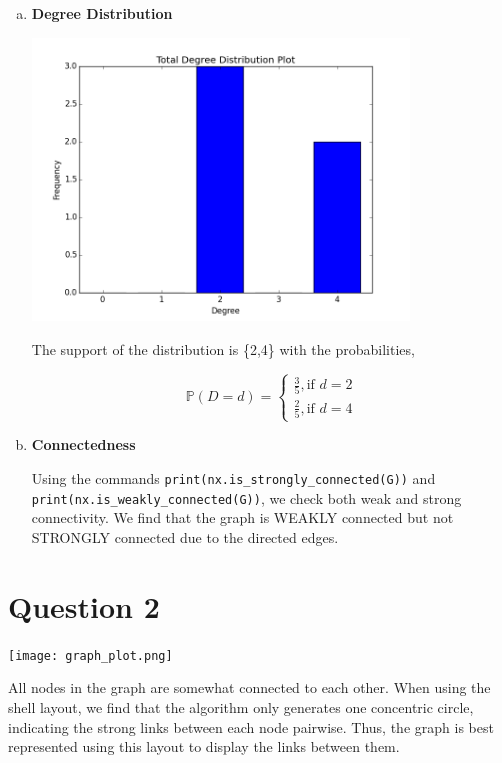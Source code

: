 \documentclass[a4paper]{article}
\begin{document}
\begin{enumerate}[(a)]
\item \textbf{Degree Distribution}

\begin{center}
\includegraphics[width=100mm]{degree_histogram.png}
\end{center}

The support of the distribution is \{2,4\} with the probabilities,

$$\mathbb{P}(D=d)=
\begin{cases}
\frac{3}{5}, \text{if }d=2\\
\frac{2}{5}, \text{if }d=4
\end{cases}
$$

\item \textbf{Connectedness}

Using the commands \texttt{print(nx.is\_strongly\_connected(G))} and \texttt{print(nx.is\_weakly\_connected(G))}, we check both weak and strong connectivity. We find that the graph is WEAKLY connected but not STRONGLY connected due to the directed edges.

\end{enumerate}

\section*{Question 2}

\begin{center}
\texttt{[image: graph\_plot.png]}
\end{center}

All nodes in the graph are somewhat connected to each other. When using the shell layout, we find that the algorithm only generates one concentric circle, indicating the strong links between each node pairwise. Thus, the graph is best represented using this layout to display the  links between them.
\end{document}
